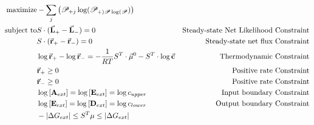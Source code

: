 $$
\begin{aligned}
    \text{maximize}   & - \sum_j\left(\mathscr P_{+j}\log(\mathscr P_{+)   \mathscr P\log(\mathscr P})\right)   & \\
    \text{subject to}  &
    S\cdot(\vec{\bf L}_+-\vec{\bf L}_-) = 0  & 
    \text{Steady-state Net Likelihood Constraint} \\
                         & S\cdot(\vec{\bf r}_+-\vec{\bf r}_-) = 0 & \text{Steady-state net flux Constraint} \\
                       &\log\vec{\bf r}_+ -\log\vec{\bf r}_-= -\frac{1}{RT}S^T\cdot\vec{\mu}^0 - S^T\cdot\log\vec{\bf c} & \text{Thermodynamic Constraint} \\
                         & \vec{\bf r}_+ \geq 0 & \text{Positive rate Constraint} \\
                         & \vec{\bf r}_- \geq 0 & \text{Positive rate Constraint} \\
                      & \log \left[{\bf A}_{ext}\right] = \log \left[{\bf E}_{ext}\right] =  \log c_{upper} & \text{Input boundary Constraint} \\
                      & \log \left[{\bf E}_{ext}\right] = \log \left[{\bf D}_{ext}\right] = \log c_{lower}  & \text{Output boundary Constraint} \\         
      & -\left|\Delta G_{ext}\right| \leq {S}^{T}\mu \leq \left|\Delta G_{ext}\right|
    \end{aligned}$$ 